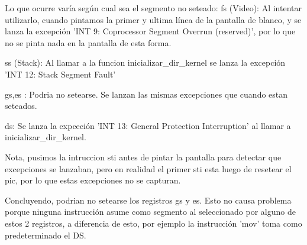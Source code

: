 Lo que ocurre varía según cual sea el segmento no seteado:
	fs (Video): Al intentar utilizarlo, cuando pintamos la primer y ultima línea de la pantalla de blanco, y se lanza la excepción 'INT 9: Coprocessor Segment Overrun (reserved)', por lo que no se pinta nada en la pantalla de esta forma.
	
	ss (Stack): Al llamar a la funcion inicializar\_dir\_kernel se lanza la excepción 'INT 12: Stack Segment Fault'
	
	gs,es : Podria no setearse. Se lanzan las mismas excepciones que cuando estan seteados. 
	
	ds: Se lanza la expceción 'INT 13: General Protection Interruption' al llamar a inicializar\_dir\_kernel.
	
Nota, pusimos la intruccion sti antes de pintar la pantalla para detectar que excepciones se lanzaban, pero en realidad el primer sti esta luego de resetear el pic, por lo que estas excepciones no se capturan. 
	
Concluyendo, podrian no setearse los registros gs y es. Esto no causa problema porque ninguna instrucción asume como segmento al seleccionado por alguno de estos 2 registros, a diferencia de esto, por ejemplo la instrucción 'mov' toma como predeterminado el DS.